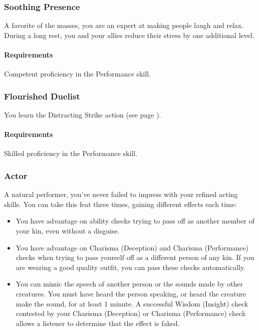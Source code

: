 \subsubsection{Soothing Presence} \label{feat::soothingpresence}
    A favorite of the masses, you are an expert at making people laugh and relax.
    During a long rest, you and your allies reduce their stress by one additional level.
    \paragraph{Requirements} Competent proficiency in the Performance skill.
\subsubsection{Flourished Duelist} \label{feat::flourishedduelist}
    You learn the Distracting Strike action (see page \pageref{act::distractingstrike}).
    \paragraph{Requirements} Skilled proficiency in the Performance skill.
\subsubsection{Actor} \label{feat::actor}
    A natural performer, you've never failed to impress with your refined acting skills.
    You can take this feat three times, gaining different effects each time:
    \begin{itemize}
        \item You have advantage on ability checks trying to pass off as another member of your kin, even without a disguise.
        \item You have advantage on Charisma (Deception) and Charisma (Performance) checks when trying to pass yourself off as a different person of any kin.
        If you are wearing a good quality outfit, you can pass these checks automatically.
        \item You can mimic the speech of another person or the sounds made by other creatures.
        You must have heard the person speaking, or heard the creature make the sound, for at least 1 minute.
        A successful Wisdom (Insight) check contested by your Charisma (Deception) or Charisma (Performance) check allows a listener to determine that the effect is faked.
    \end{itemize}
